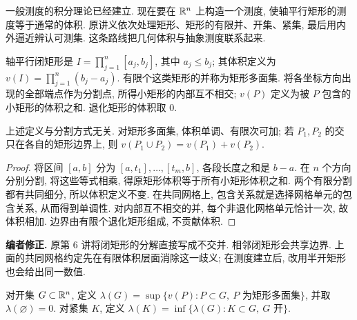 \label{ra:c3:chapter}


一般测度的积分理论已经建立. 现在要在 $\mathbb R^n$ 上构造一个测度, 使轴平行矩形的测度等于通常的体积. 原讲义依次处理矩形、矩形的有限并、开集、紧集, 最后用内外逼近辨认可测集. 这条路线把几何体积与抽象测度联系起来.

\begin{definition}\label{ra:c3:polygon}
轴平行闭矩形是 $I=\prod_{j=1}^n[a_j,b_j]$, 其中 $a_j\le b_j$; 其体积定义为 $v(I)=\prod_{j=1}^n(b_j-a_j)$. 有限个这类矩形的并称为矩形多面集. 将各坐标方向出现的全部端点作为分割点, 所得小矩形的内部互不相交; $v(P)$ 定义为被 $P$ 包含的小矩形的体积之和. 退化矩形的体积取 $0$.
\end{definition}

\begin{lemma}\label{ra:c3:grid}
上述定义与分割方式无关. 对矩形多面集, 体积单调、有限次可加; 若 $P_1,P_2$ 的交只在各自的矩形边界上, 则 $v(P_1\cup P_2)=v(P_1)+v(P_2)$.
\end{lemma}
\begin{proof}
将区间 $[a,b]$ 分为 $[a,t_1],\ldots,[t_m,b]$, 各段长度之和是 $b-a$. 在 $n$ 个方向分别分割, 将这些等式相乘, 得原矩形体积等于所有小矩形体积之和. 两个有限分割都有共同细分, 所以体积定义不变. 在共同网格上, 包含关系就是选择网格单元的包含关系, 从而得到单调性. 对内部互不相交的并, 每个非退化网格单元恰计一次, 故体积相加. 边界由有限个退化矩形组成, 不贡献体积.
\end{proof}

\begin{remark}
\textbf{编者修正.} 原第 6 讲将闭矩形的分解直接写成不交并. 相邻闭矩形会共享边界. 上面的共同网格约定先在有限体积层面消除这一歧义; 在测度建立后, 改用半开矩形也会给出同一数值.
\end{remark}


\begin{definition}\label{ra:c3:opencompact}
对开集 $G\subset\mathbb R^n$, 定义 $\lambda(G)=\sup\{v(P):P\subset G,\ P\text{ 为矩形多面集}\}$, 并取 $\lambda(\varnothing)=0$. 对紧集 $K$, 定义 $\lambda(K)=\inf\{\lambda(G):K\subset G,\ G\text{ 开}\}$.
\end{definition}

